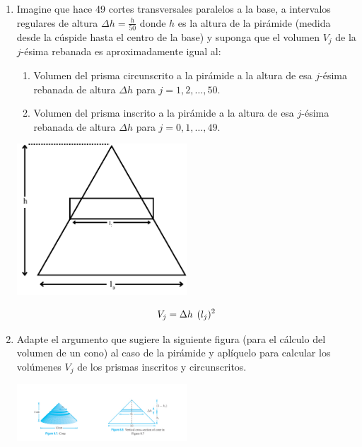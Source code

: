\documentclass[12pt]{article}
\begin{document}
\begin{enumerate}

    \item Imagine que hace 49 cortes transversales paralelos a la base, a intervalos regulares de altura $\Delta h = \frac{h}{50}$ donde $h$ es la altura de la pirámide (medida desde la cúspide hasta el centro de la base) y suponga que el volumen $V_j$ de la $j$-ésima rebanada es aproximadamente igual al:
  
        \begin{enumerate}
  
            \item Volumen del prisma circunscrito a la pirámide a la altura de esa $j$-ésima rebanada de altura $\Delta h$ para $j = 1, 2, \dots, 50$.
  
            \item Volumen del prisma inscrito a la pirámide a la altura de esa $j$-ésima rebanada de altura $\Delta h$ para $j = 0, 1, \dots, 49$.
  
        \end{enumerate}
  
        \includegraphics[width=0.5\textwidth, center]{piramide1.png}
  
        \[V_j = \Delta h \hspace{4.4pt}(l_j)^2\]

    \item Adapte el argumento que sugiere la siguiente figura (para el cálculo del volumen de un cono) al caso de la pirámide y aplíquelo para calcular los volúmenes $V_j$ de los prismas inscritos y circunscritos. 
 
        \includegraphics[width=0.5\textwidth, center]{cono.png} \\


\end{enumerate}
\end{document}
